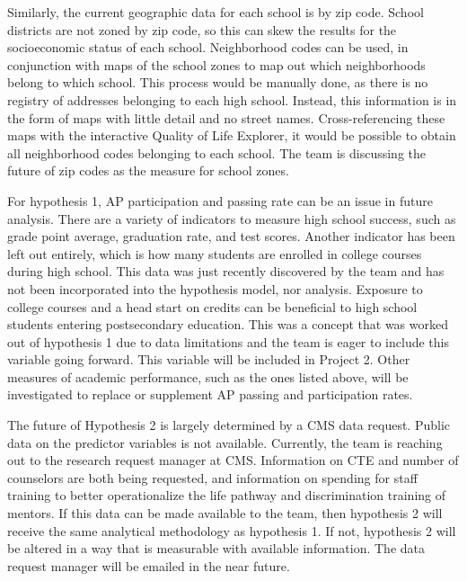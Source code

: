 Similarly, the current geographic data for each school is by zip code. 
School districts are not zoned by zip code, so this can skew the results for the socioeconomic status of each school. Neighborhood codes can be used, in conjunction with maps of the school zones to map out which neighborhoods belong to which school. 
This process would be manually done, as there is no registry of addresses belonging to each high school. 
Instead, this information is in the form of maps with little detail and no street names. 
Cross-referencing these maps with the interactive Quality of Life Explorer, it would be possible to obtain all neighborhood codes belonging to each school. 
The team is discussing the future of zip codes as the measure for school zones. 

For hypothesis 1, AP participation and passing rate can be an issue in future analysis. 
There are a variety of indicators to measure high school success, such as grade point average, graduation rate, and test scores. 
Another indicator has been left out entirely, which is how many students are enrolled in college courses during high school. 
This data was just recently discovered by the team and has not been incorporated into the hypothesis model, nor analysis. 
Exposure to college courses and a head start on credits can be beneficial to high school students entering postsecondary education. 
This was a concept that was worked out of hypothesis 1 due to data limitations and the team is eager to include this variable going forward. 
This variable will be included in Project 2. 
Other measures of academic performance, such as the ones listed above, will be investigated to replace or supplement AP passing and participation rates. 

The future of Hypothesis 2 is largely determined by a CMS data request. Public data on the predictor variables is not available. 
Currently, the team is reaching out to the research request manager at CMS. 
Information on CTE and number of counselors are both being requested, and information on spending for staff training to better operationalize the life pathway and discrimination training of mentors. 
If this data can be made available to the team, then hypothesis 2 will receive the same analytical methodology as hypothesis 1. 
If not, hypothesis 2 will be altered in a way that is measurable with available information. 
The data request manager will be emailed in the near future. 


